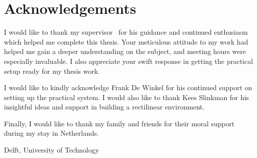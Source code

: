 %
\chapter{Acknowledgements}%

I would like to thank my supervisor \mscreaderone\ for his guidance and continued enthusiasm which helped me complete this thesis. Your meticulous attitude to my work had helped me gain a deeper understanding on the subject, and meeting hours were especially invaluable. I also appreciate your swift response in getting the practical setup ready for my thesis work.

I would like to kindly acknowledge Frank De Winkel for his continued support on setting up the practical system. I would also like to thank Kees Slinkman for his insightful ideas and support in building a rectilinear environment.

Finally, I would like to thank my family and friends for their moral support during my stay in Netherlands. 
\vspace*{15mm}

Delft, University of Technology \hfill \mscname \\
\mscdate